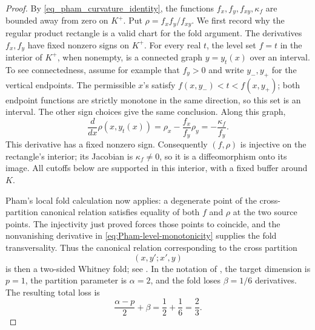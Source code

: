 \documentclass[11pt]{article}
\begin{document}
\begin{proof}
By \eqref{eq_pham_curvature_identity}, the functions
$f_x,f_y,f_{xy},\kappa_f$ are bounded away from zero on $K^+$.
Put \(\rho=f_xf_y/f_{xy}\).  We first record why the regular
product rectangle is a valid chart for the fold argument.
The derivatives \(f_x,f_y\) have fixed nonzero signs on \(K^+\).
For every real \(t\), the level set \(f=t\) in the interior of
\(K^+\), when nonempty, is a connected graph \(y=y_t(x)\) over an
interval.  To see connectedness, assume for example that \(f_y>0\)
and write \(y_-,y_+\) for the vertical endpoints.  The permissible
\(x\)'s satisfy \(f(x,y_-)<t<f(x,y_+)\); both endpoint functions
are strictly monotone in the same direction, so this set is an
interval.  The other sign choices give the same conclusion.
Along this graph,
\begin{equation}
 \frac{d}{dx}\rho(x,y_t(x))
 =\rho_x-\frac{f_x}{f_y}\rho_y
 =-\frac{\kappa_f}{f_y}.
 \label{eq:Pham-level-monotonicity}
\end{equation}
This derivative has a fixed nonzero sign.  Consequently
\((f,\rho)\) is injective on the rectangle's interior; its Jacobian
is \(\kappa_f\ne0\), so it is a diffeomorphism onto its image.
All cutoffs below are supported in this interior, with a fixed
buffer around \(K\).

Pham's local fold calculation now applies: a degenerate point of the
cross-partition canonical relation satisfies equality of both \(f\)
and \(\rho\) at the two source points.  The injectivity just proved
forces those points to coincide, and the nonvanishing derivative in
\eqref{eq:Pham-level-monotonicity} supplies the fold transversality.
Thus the canonical relation corresponding to the cross
partition
\[
 (x,y';x',y)
\]
is then a two-sided Whitney fold; see
\cite[Lemma~4.2]{PhamFIO}.  In the notation of
\cite[Theorem~3.1]{PhamFIO}, the target dimension is $p=1$, the
partition parameter is $\alpha=2$, and the fold loses
$\beta=1/6$ derivatives.  The resulting total loss is
\begin{equation}
 \frac{\alpha-p}{2}+\beta=\frac{1}{2}+\frac{1}{6}=\frac{2}{3}.
 \label{eq_pham_two_thirds_loss}
\end{equation}


\end{proof}
\end{document}
